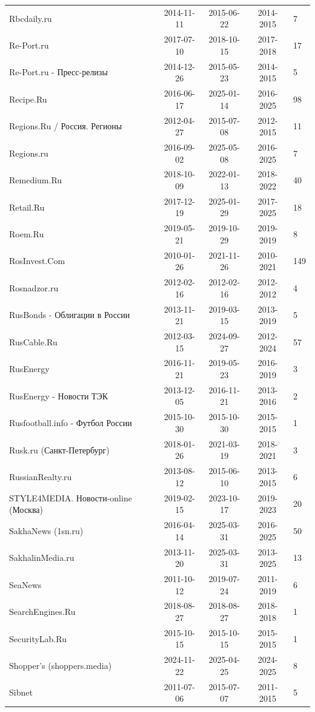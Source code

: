 \begin{longtable}{p{6cm}cccp{2cm}}
Rbcdaily.ru & 2014-11-11 & 2015-06-22 & 2014-2015 & 7\\
Re-Port.ru & 2017-07-10 & 2018-10-15 & 2017-2018 & 17\\
Re-Port.ru - Пресс-релизы & 2014-12-26 & 2015-05-23 & 2014-2015 & 5\\
Recipe.Ru & 2016-06-17 & 2025-01-14 & 2016-2025 & 98\\
Regions.Ru / Россия. Регионы & 2012-04-27 & 2015-07-08 & 2012-2015 & 11\\
Regions.ru & 2016-09-02 & 2025-05-08 & 2016-2025 & 7\\
Remedium.Ru & 2018-10-09 & 2022-01-13 & 2018-2022 & 40\\
Retail.Ru & 2017-12-19 & 2025-01-29 & 2017-2025 & 18\\
Roem.Ru & 2019-05-21 & 2019-10-29 & 2019-2019 & 8\\
RosInvest.Com & 2010-01-26 & 2021-11-26 & 2010-2021 & 149\\
Rosnadzor.ru & 2012-02-16 & 2012-02-16 & 2012-2012 & 4\\
RusBonds - Облигации в России & 2013-11-21 & 2019-03-15 & 2013-2019 & 5\\
RusCable.Ru & 2012-03-15 & 2024-09-27 & 2012-2024 & 57\\
RusEnergy & 2016-11-21 & 2019-05-23 & 2016-2019 & 3\\
RusEnergy - Новости ТЭК & 2013-12-05 & 2016-11-21 & 2013-2016 & 2\\
Rusfootball.info - Футбол России & 2015-10-30 & 2015-10-30 & 2015-2015 & 1\\
Rusk.ru (Санкт-Петербург) & 2018-01-26 & 2021-03-19 & 2018-2021 & 3\\
RussianRealty.ru & 2013-08-12 & 2015-06-10 & 2013-2015 & 6\\
STYLE4MEDIA. Новости-online (Москва) & 2019-02-15 & 2023-10-17 & 2019-2023 & 20\\
SakhaNews (1sn.ru) & 2016-04-14 & 2025-03-31 & 2016-2025 & 50\\
SakhalinMedia.ru & 2013-11-20 & 2025-03-31 & 2013-2025 & 13\\
SeaNews & 2011-10-12 & 2019-07-24 & 2011-2019 & 6\\
SearchEngines.Ru & 2018-08-27 & 2018-08-27 & 2018-2018 & 1\\
SecurityLab.Ru & 2015-10-15 & 2015-10-15 & 2015-2015 & 1\\
Shopper’s (shoppers.media) & 2024-11-22 & 2025-04-25 & 2024-2025 & 8\\
Sibnet & 2011-07-06 & 2015-07-07 & 2011-2015 & 5\\

\end{longtable}

